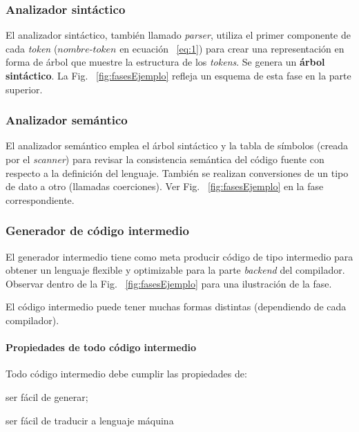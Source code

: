 \subsubsection{Analizador sintáctico}

    El analizador sintáctico, también llamado \emph{parser}, utiliza el primer componente de cada \emph{token} ($nombre\text{-}token$ en ecuación ~\ref{eq:1}) para crear una representación en
    forma de árbol que muestre la estructura de los \emph{tokens}. Se genera un  \textbf{árbol sintáctico}. La Fig. ~\ref{fig:fasesEjemplo} refleja un esquema de esta fase en la parte superior.


\subsubsection{Analizador semántico}

    El analizador semántico emplea el árbol sintáctico y la tabla de símbolos (creada por el \emph{scanner}) para revisar la
    consistencia semántica del código fuente con respecto a la definición del lenguaje. También se realizan conversiones de un tipo de dato a otro (llamadas coerciones).
    Ver Fig. ~\ref{fig:fasesEjemplo} en la fase correspondiente.


\subsubsection{Generador de código intermedio}

    El generador intermedio tiene como meta producir código de tipo intermedio para obtener un lenguaje flexible y optimizable para la
    parte \emph{backend} del compilador. Observar dentro de la Fig. ~\ref{fig:fasesEjemplo} para una ilustración de la fase.

    El código intermedio puede tener muchas formas distintas (dependiendo de cada compilador).

\paragraph*{Propiedades de todo código intermedio}

Todo código intermedio debe cumplir las propiedades de:

    \begin{enumerate*}[label=\itshape\alph*\upshape)]
        \item ser fácil de generar;
        \item ser fácil de traducir a lenguaje máquina
    \end{enumerate*}

